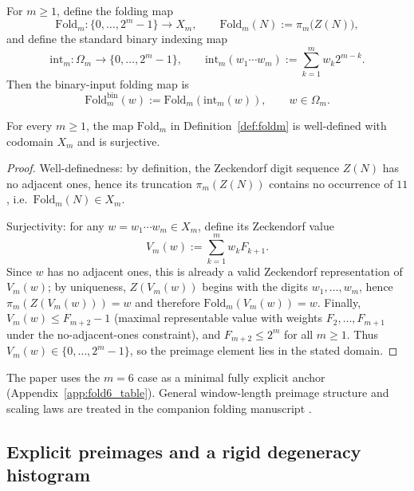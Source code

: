\begin{definition}
\label{def:foldm}
For $m\ge 1$, define the folding map
\[
\mathrm{Fold}_m:\{0,\dots,2^m-1\}\to X_m,\qquad \mathrm{Fold}_m(N):=\pi_m\bigl(Z(N)\bigr),
\]
and define the standard binary indexing map
\[
\mathrm{int}_m:\Omega_m\to\{0,\dots,2^m-1\},
\qquad
\mathrm{int}_m(w_1\cdots w_m):=\sum_{k=1}^m w_k 2^{m-k}.
\]
Then the binary-input folding map is
\[
\mathrm{Fold}^{\mathrm{bin}}_m(w):=\mathrm{Fold}_m(\mathrm{int}_m(w)),\qquad w\in\Omega_m.
\]
\end{definition}

\begin{proposition}
\label{prop:foldm_surjective}
For every $m\ge 1$, the map $\mathrm{Fold}_m$ in Definition~\ref{def:foldm} is well-defined with codomain $X_m$ and is surjective.
\end{proposition}

\begin{proof}
Well-definedness: by definition, the Zeckendorf digit sequence $Z(N)$ has no adjacent ones, hence its truncation $\pi_m(Z(N))$ contains no occurrence of $11$, i.e.\ $\mathrm{Fold}_m(N)\in X_m$.

Surjectivity: for any $w=w_1\cdots w_m\in X_m$, define its Zeckendorf value
\[
V_m(w):=\sum_{k=1}^m w_k F_{k+1}.
\]
Since $w$ has no adjacent ones, this is already a valid Zeckendorf representation of $V_m(w)$; by uniqueness, $Z(V_m(w))$ begins with the digits $w_1,\dots,w_m$, hence $\pi_m(Z(V_m(w)))=w$ and therefore $\mathrm{Fold}_m(V_m(w))=w$.
Finally, $V_m(w)\le F_{m+2}-1$ (maximal representable value with weights $F_2,\dots,F_{m+1}$ under the no-adjacent-ones constraint), and $F_{m+2}\le 2^m$ for all $m\ge 1$.
Thus $V_m(w)\in\{0,\dots,2^m-1\}$, so the preimage element lies in the stated domain.
\end{proof}

\begin{remark}[Scope]
The paper uses the $m=6$ case as a minimal fully explicit anchor (Appendix~\ref{app:fold6_table}).
General window-length preimage structure and scaling laws are treated in the companion folding manuscript \cite{Ma2025RF}.
\end{remark}

\subsection{Explicit preimages and a rigid degeneracy histogram}
\label{subsec:fold6_degeneracy}

